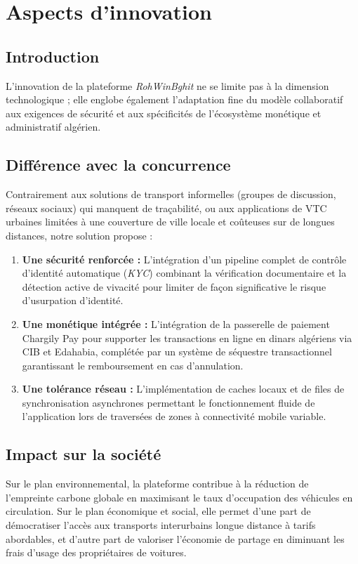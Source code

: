 \documentclass[11pt,a4paper]{article}
\begin{document}
\section{Aspects d'innovation}

\subsection{Introduction}
L'innovation de la plateforme \textit{RohWinBghit} ne se limite pas à la dimension technologique ; elle englobe également l'adaptation fine du modèle collaboratif aux exigences de sécurité et aux spécificités de l'écosystème monétique et administratif algérien.

\subsection{Différence avec la concurrence}
Contrairement aux solutions de transport informelles (groupes de discussion, réseaux sociaux) qui manquent de traçabilité, ou aux applications de VTC urbaines limitées à une couverture de ville locale et coûteuses sur de longues distances, notre solution propose :
\begin{enumerate}[label=\Alph*.]
  \item \textbf{Une sécurité renforcée :} L'intégration d'un pipeline complet de contrôle d'identité automatique (\textit{KYC}) combinant la vérification documentaire et la détection active de vivacité pour limiter de façon significative le risque d'usurpation d'identité.
  \item \textbf{Une monétique intégrée :} L'intégration de la passerelle de paiement Chargily Pay pour supporter les transactions en ligne en dinars algériens via CIB et Edahabia, complétée par un système de séquestre transactionnel garantissant le remboursement en cas d'annulation.
  \item \textbf{Une tolérance réseau :} L'implémentation de caches locaux et de files de synchronisation asynchrones permettant le fonctionnement fluide de l'application lors de traversées de zones à connectivité mobile variable.
\end{enumerate}

\subsection{Impact sur la société}
Sur le plan environnemental, la plateforme contribue à la réduction de l'empreinte carbone globale en maximisant le taux d'occupation des véhicules en circulation. Sur le plan économique et social, elle permet d'une part de démocratiser l'accès aux transports interurbains longue distance à tarifs abordables, et d'autre part de valoriser l'économie de partage en diminuant les frais d'usage des propriétaires de voitures.
\end{document}
